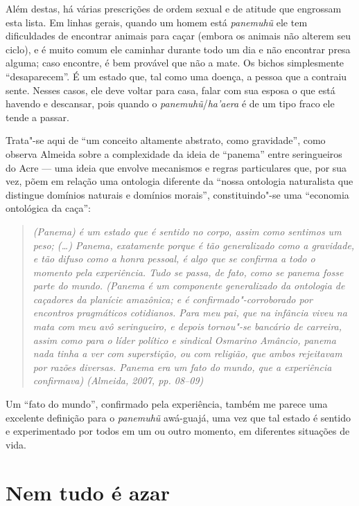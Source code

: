 Além destas, há várias prescrições de ordem sexual e de atitude que
engrossam esta lista. Em linhas gerais, quando um homem está
\emph{panemuhũ} ele tem dificuldades de encontrar animais para caçar
(embora os animais não alterem seu ciclo), e é muito comum ele caminhar
durante todo um dia e não encontrar presa alguma; caso encontre, é bem
provável que não a mate. Os bichos simplesmente ``desaparecem''. É um
estado que, tal como uma doença, a pessoa que a contraiu sente. Nesses
casos, ele deve voltar para casa, falar com sua esposa o que está
havendo e descansar, pois quando o \emph{panemuhũ}/\emph{ha'aera} é de
um tipo fraco ele tende a passar.

Trata"-se aqui de ``um conceito altamente abstrato, como gravidade'',
como observa Almeida sobre a complexidade da ideia de ``panema'' entre
seringueiros do Acre --- uma ideia que envolve mecanismos e regras
particulares que, por sua vez, põem em relação uma ontologia diferente
da ``nossa ontologia naturalista que distingue domínios naturais e
domínios morais'', constituindo"-se uma ``economia ontológica da caça'':

\begin{quote}
\emph{(Panema) é um estado que é sentido no corpo, assim como sentimos um
peso; (\ldots{}) Panema, exatamente porque é tão generalizado como a
gravidade, e tão difuso como a honra pessoal, é algo que se confirma a
todo o momento pela experiência. Tudo se passa, de fato, como se panema
fosse parte do mundo. (Panema é um componente generalizado da
ontologia de caçadores da planície amazônica; e é confirmado"-corroborado
por encontros pragmáticos cotidianos. Para meu pai, que na infância
viveu na mata com meu avô seringueiro, e depois tornou"-se bancário de
carreira, assim como para o líder político e sindical Osmarino Amâncio,
panema nada tinha a ver com superstição, ou com religião, que ambos
rejeitavam por razões diversas. Panema era um fato do mundo, que a
experiência confirmava) (Almeida, 2007, pp. 08--09)}
\end{quote}

Um ``fato do mundo'', confirmado pela experiência, também me parece uma
excelente definição para o \emph{panemuhũ} awá-guajá, uma vez que tal
estado é sentido e experimentado por todos em um ou outro momento, em
diferentes situações de vida.

\section{Nem tudo é azar}

